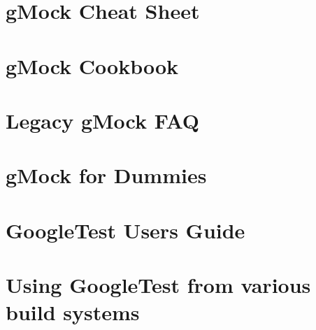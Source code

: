 \let\mypdfximage\pdfximage\def\pdfximage{\immediate\mypdfximage}\documentclass[twoside]{book}
\newcommand{\+}{\discretionary{\mbox{\scriptsize$\hookleftarrow$}}{}{}}
\begin{document}
\chapter{g\+Mock Cheat Sheet}
\label{md__home_mary_VegaProgramEngineering_2024_build__deps_googletest-src_docs_gmock_cheat_sheet}

\chapter{g\+Mock Cookbook}
\label{md__home_mary_VegaProgramEngineering_2024_build__deps_googletest-src_docs_gmock_cook_book}

\chapter{Legacy g\+Mock F\+AQ}
\label{md__home_mary_VegaProgramEngineering_2024_build__deps_googletest-src_docs_gmock_faq}

\chapter{g\+Mock for Dummies}
\label{md__home_mary_VegaProgramEngineering_2024_build__deps_googletest-src_docs_gmock_for_dummies}

\chapter{Google\+Test User\textquotesingle{}s Guide}
\label{md__home_mary_VegaProgramEngineering_2024_build__deps_googletest-src_docs_index}

\chapter{Using Google\+Test from various build systems}
\label{md__home_mary_VegaProgramEngineering_2024_build__deps_googletest-src_docs_pkgconfig}

\end{document}
